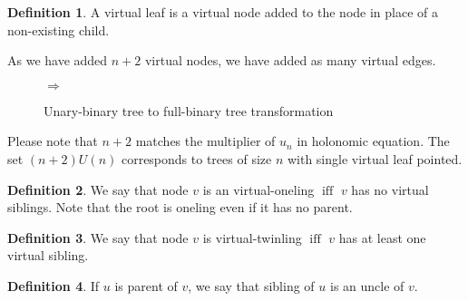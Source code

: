 \documentclass[final]{article}
\theoremstyle{definition}
\newtheorem{definition}{Definition}[subsection]
\theoremstyle{definition}
\theoremstyle{remark}
\DeclareMathOperator{\textiff}{\text{iff}}
\newcommand{\includeinlinesvg}[2]{\begin{minipage}{#1\textwidth}\end{minipage}}
\begin{document}
\begin{definition}
    A virtual leaf is a virtual node added to the node in place of a non-existing child.
\end{definition}

As we have added \(n + 2\) virtual nodes, we have added as many virtual edges.

\begin{figure}[H]
    \centering
    \includeinlinesvg{.2}{unary_binary__base}%
    \(\Rightarrow\)%
    \includeinlinesvg{.3}{unary_binary__full}
    \caption{Unary-binary tree to full-binary tree transformation}
    \label{fig:unary_binary_transformation}
\end{figure}

Please note that \(n + 2\) matches the multiplier of \(u_n\) in holonomic equation. The set \((n + 2) U(n)\) corresponds to trees of size \(n\) with single virtual leaf pointed.

\begin{definition}
    We say that node \(v\) is an virtual-oneling \(\textiff\) \(v\) has no virtual siblings. Note that the root is oneling even if it has no parent.
\end{definition}

\begin{definition}
    We say that node \(v\) is virtual-twinling \(\textiff\) \(v\) has at least one virtual sibling.
\end{definition}

\begin{definition}
    If \(u\) is parent of \(v\), we say that sibling of \(u\) is an uncle of \(v\).
\end{definition}
\end{document}
